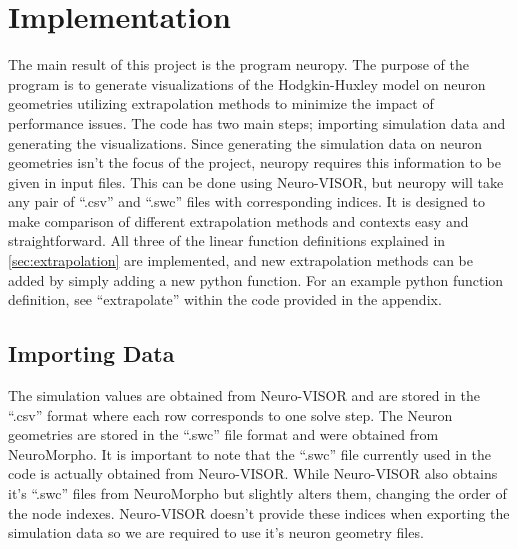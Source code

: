 
\section{Implementation}%
\label{sec:implementation}

The main result of this project is the program neuropy\cite{neuropy}.
The purpose of the program is to generate visualizations of the Hodgkin-Huxley model on neuron geometries utilizing extrapolation methods to minimize the impact of performance issues.
The code has two main steps; importing simulation data and generating the visualizations.
Since generating the simulation data on neuron geometries isn't the focus of the project, neuropy requires this information to be given in input files.
This can be done using Neuro-VISOR, but neuropy will take any pair of ``.csv'' and ``.swc'' files with corresponding indices.
It is designed to make comparison of different extrapolation methods and contexts easy and straightforward. 
All three of the linear function definitions explained in \cref{sec:extrapolation} are implemented, and new extrapolation methods can be added by simply adding a new python function.
For an example python function definition, see ``extrapolate'' within the code provided in the appendix.


\subsection{Importing Data}%
\label{sub:importing_data}
The simulation values are obtained from Neuro-VISOR\cite{neuroVISOR} and are stored in the ``.csv'' format where each row corresponds to one solve step.
The Neuron geometries are stored in the ``.swc'' file format\cite{swc} and were obtained from NeuroMorpho\cite{neuroMorpho}.
It is important to note that the ``.swc'' file currently used in the code is actually obtained from Neuro-VISOR.
While Neuro-VISOR also obtains it's ``.swc'' files from NeuroMorpho but slightly alters them, changing the order of the node indexes\cite{neuropy}.
Neuro-VISOR doesn't provide these indices when exporting the simulation data so we are required to use it's neuron geometry files.

